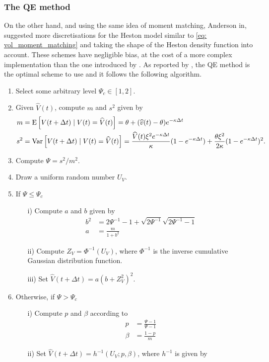 \subsubsection{The QE method}\label{sec:The QE method}
On the other hand, and using the same idea of moment matching, Anderson in\cite{andersen2007efficient}, suggested  more discretisations for the Heston model similar to \eqref{eq: vol_moment_matching} and taking the shape of the Heston density function into
account.  These schemes have negligible bias, at the cost of a more complex implementation than  the one introduced by \cite{andersen2005extended}. As reported by \cite{andersen2007efficient}, the QE method is the optimal scheme to use and it follows the following algorithm.
\begin{enumerate}
\item Select some arbitrary level $\Psi_c \in [1,2]$.
\item  Given $\hat{V}(t)$, compute $m$ and $s^2$ given by
\begin{align*}
m &=\mathrm{E}\left[V(t+\Delta t) \mid V(t)=\widehat{V}(t)\right]=\theta+(\widehat{v}(t)-\theta) e^{-\kappa \Delta t} \\
s^2 &= \text{Var}\left[V(t+\Delta t) \mid V(t)=\widehat{V}(t)\right]=\frac{\widehat{V}(t) \xi^2 e^{-\kappa \Delta t}}{\kappa} (1-e^{-\kappa \Delta t}) +\frac{\theta \xi^2}{2 \kappa} (1-e^{-\kappa \Delta t})^2.
\end{align*}
\item Compute $\Psi=s^2/m^2$.
\item Draw a uniform random number $U_V$.
\item If $\Psi\le \Psi_c$
\begin{enumerate}
\item[i)] Compute $a$ and $b$ given by
\begin{align*}
b^2&=2 \Psi^{-1}-1+\sqrt{2 \Psi^{-1}}\sqrt{2 \Psi^{-1}-1}\\
a&=\frac{m}{1+b^2}
\end{align*}
\item[ii)] Compute $Z_V=\Phi^{-1}(U_V)$, where $\Phi^{-1}$ is the inverse cumulative
Gaussian distribution function.
\item[iii)] Set $\hat{V}(t+\Delta t)=a(b+Z_V^2)^2$.
\end{enumerate}
\item Otherwise, if $\Psi >\Psi_c$

\begin{enumerate}
\item[i)] Compute $p$ and $\beta$ according to 
\begin{align*}
p&=\frac{\Psi-1}{\Psi-1}\\
\beta&=\frac{1-p}{m}
\end{align*}
\item[ii)] Set $\hat{V}(t+\Delta t)=h^{-1}(U_V; p,\beta)$, where $h^{-1}$ is given by


\end{enumerate}
\end{enumerate}
